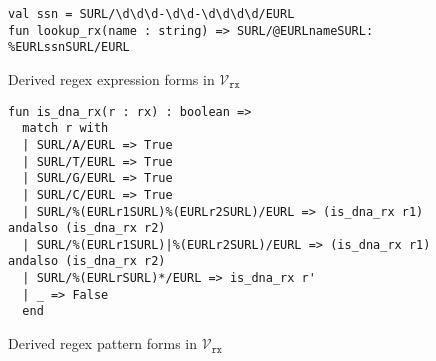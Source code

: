 \begin{figure}
\begin{lstlisting}[numbers=none]
val ssn = SURL/\d\d\d-\d\d-\d\d\d\d/EURL
fun lookup_rx(name : string) => SURL/@EURLnameSURL: %EURLssnSURL/EURL
\end{lstlisting}
\vspace{-5px}
\caption{Derived regex expression forms in $\mathcal{V}_\texttt{rx}$}
\label{fig:derived-spliced-subexpressions}
\end{figure}
\begin{figure}
\begin{lstlisting}[numbers=none]
fun is_dna_rx(r : rx) : boolean => 
  match r with 
  | SURL/A/EURL => True
  | SURL/T/EURL => True
  | SURL/G/EURL => True
  | SURL/C/EURL => True
  | SURL/%(EURLr1SURL)%(EURLr2SURL)/EURL => (is_dna_rx r1) andalso (is_dna_rx r2)
  | SURL/%(EURLr1SURL)|%(EURLr2SURL)/EURL => (is_dna_rx r1) andalso (is_dna_rx r2)
  | SURL/%(EURLrSURL)*/EURL => is_dna_rx r'
  | _ => False
  end
\end{lstlisting}
\vspace{-8px}
\caption{Derived regex pattern forms in $\mathcal{V}_\texttt{rx}$}
\label{fig:derived-pattern-syntax}
\end{figure}


